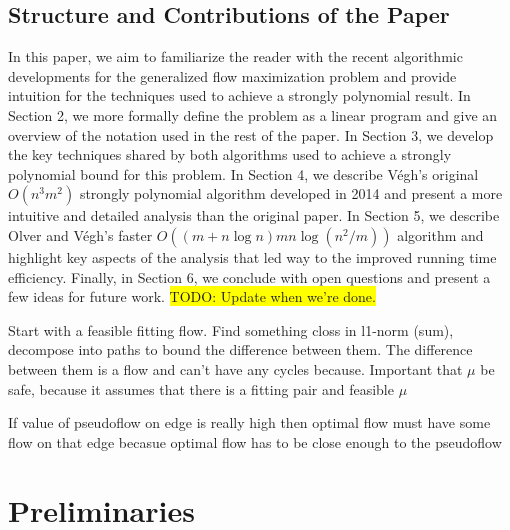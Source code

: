 \documentclass[11pt]{article}
\theoremstyle{definition}
\theoremstyle{definition}
\newcommand{\todo}[1]{\colorbox{yellow}{TODO: #1}}
\begin{document}
	\subsection{Structure and Contributions of the Paper} In this paper, we aim to familiarize the reader with the recent algorithmic developments for the generalized flow maximization problem and provide intuition for the techniques used to achieve a strongly polynomial result. In Section 2, we more formally define the problem as a linear program and give an overview of the notation used in the rest of the paper. In Section 3, we develop the key techniques shared by both algorithms used to achieve a strongly polynomial bound for this problem. In Section 4, we describe Végh's original $O(n^3m^2)$ strongly polynomial algorithm developed in 2014 and present a more intuitive and detailed analysis than the original paper. In Section 5, we describe Olver and Végh's faster $O((m + n\log n)mn\log(n^2 / m))$ algorithm and highlight key aspects of the analysis that led way to the improved running time efficiency. Finally, in Section 6, we conclude with open questions and present a few ideas for future work. \todo{Update when we're done.}
    
Start with a feasible fitting flow. Find something closs in l1-norm (sum), decompose into paths to bound the difference between them. The difference between them is a flow and can't have any cycles because.
Important that $\mu$ be safe, because it assumes that there is a fitting pair and feasible $\mu$

If value of pseudoflow on edge is really high then optimal flow must have some flow on that edge becasue optimal flow has to be close enough to the pseudoflow
    
\section{Preliminaries}
\end{document}
